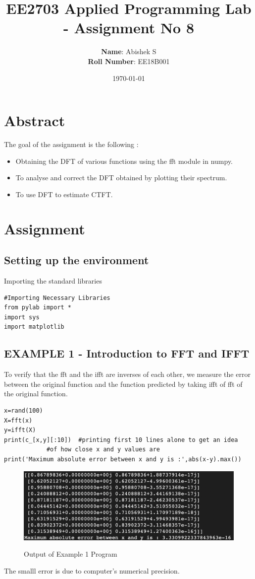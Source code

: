 \documentclass[11pt, a4paper]{article}
\title{EE2703 Applied Programming Lab - Assignment No 8}
\author{
  \textbf{Name}: Abishek S\\
  \textbf{Roll Number}: EE18B001
}\date{\today}
\begin{document}
		
\maketitle 
\section{Abstract}
The goal of the assignment is the following :
\begin{itemize}
\item Obtaining the DFT of various functions using the fft module in numpy.
\item To analyse and correct the DFT obtained by plotting their spectrum.
\item To use DFT to estimate CTFT.
\end{itemize}


\section{Assignment}
\subsection{Setting up the environment}
Importing the standard libraries
\begin{verbatim}
#Importing Necessary Libraries 
from pylab import *
import sys
import matplotlib
\end{verbatim}


\subsection{EXAMPLE 1 - Introduction to FFT and IFFT}
{
To verify that the fft and the ifft are inverses of each other, we measure the error between the original function and the function predicted by taking ifft of fft of the original function.
}
\begin{verbatim}
x=rand(100)
X=fft(x)
y=ifft(X)
print(c_[x,y][:10])  #printing first 10 lines alone to get an idea 
			#of how close x and y values are
print('Maximum absolute error between x and y is :',abs(x-y).max())
\end{verbatim}
\begin{figure}[H]
   	\centering
   	\includegraphics[scale=0.5]{ex1.png}
   	\label{fig:ex1}
   	\caption{Output of Example 1 Program}
\end{figure}
{
The smalll error is due to computer's numerical precision.
}
\end{document}
